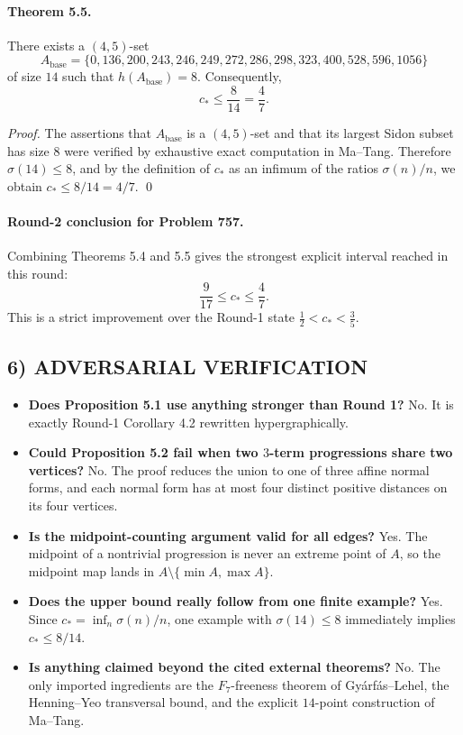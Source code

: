 \paragraph{Theorem 5.5.}
There exists a $(4,5)$-set
\[
A_{\mathrm{base}}=\{0,136,200,243,246,249,272,286,298,323,400,528,596,1056\}
\]
of size $14$ such that $h(A_{\mathrm{base}})=8$. Consequently,
\[
c_*\le \frac{8}{14}=\frac47.
\]

\emph{Proof.}
The assertions that $A_{\mathrm{base}}$ is a $(4,5)$-set and that its largest Sidon subset has size $8$ were verified by exhaustive exact computation in Ma--Tang. Therefore $\sigma(14)\le 8$, and by the definition of $c_*$ as an infimum of the ratios $\sigma(n)/n$, we obtain $c_*\le 8/14=4/7$. \qed

\paragraph{Round-2 conclusion for Problem 757.}
Combining Theorems 5.4 and 5.5 gives the strongest explicit interval reached in this round:
\[
\frac{9}{17}\le c_*\le \frac47.
\]
This is a strict improvement over the Round-1 state $\tfrac12<c_*<\tfrac35$.

\subsection*{6) ADVERSARIAL VERIFICATION}
\begin{itemize}
\item \textbf{Does Proposition 5.1 use anything stronger than Round 1?} No. It is exactly Round-1 Corollary 4.2 rewritten hypergraphically.
\item \textbf{Could Proposition 5.2 fail when two $3$-term progressions share two vertices?} No. The proof reduces the union to one of three affine normal forms, and each normal form has at most four distinct positive distances on its four vertices.
\item \textbf{Is the midpoint-counting argument valid for all edges?} Yes. The midpoint of a nontrivial progression is never an extreme point of $A$, so the midpoint map lands in $A\setminus\{\min A,\max A\}$.
\item \textbf{Does the upper bound really follow from one finite example?} Yes. Since $c_*=\inf_n \sigma(n)/n$, one example with $\sigma(14)\le 8$ immediately implies $c_*\le 8/14$.
\item \textbf{Is anything claimed beyond the cited external theorems?} No. The only imported ingredients are the $F_7$-freeness theorem of Gy\'arf\'as--Lehel, the Henning--Yeo transversal bound, and the explicit $14$-point construction of Ma--Tang.
\end{itemize}

